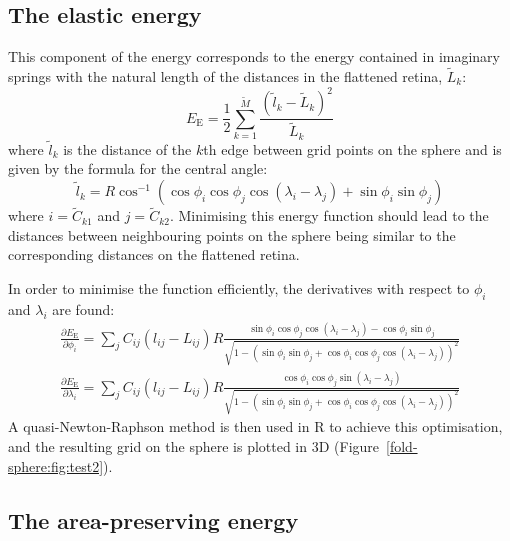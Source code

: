 \documentclass{article}
\newcommand{\EE}{\ensuremath{E_\mathrm{E}}\xspace}
\begin{document}
\subsection{The elastic energy}
\label{fold-sphere:sec:elastic-force}

This component of the energy corresponds to the energy contained in
imaginary springs with the natural length of the distances in the
flattened retina, $\tilde L_k$:
\begin{equation}
  \label{fold-sphere:eq:5}
  \EE  = \frac{1}{2} \sum_{k=1}^{\tilde M} \frac{(\tilde l_k- \tilde
    L_k)^2}{\tilde L_k}
\end{equation}
where $\tilde l_k$ is the distance of the $k$th edge between grid points on
the sphere and is given by the formula for the central angle:
\begin{equation}
  \label{fold-sphere:eq:2}
  \tilde l_k = R\cos^{-1}(\cos\phi_i\cos\phi_j\cos(\lambda_i-\lambda_j) + \sin\phi_i\sin\phi_j)
\end{equation}
where $i=\tilde C_{k1}$ and $j=\tilde C_{k2}$.  Minimising this energy function
should lead to the distances between neighbouring points on the sphere
being similar to the corresponding distances on the flattened retina.

In order to minimise the function efficiently, the derivatives with
respect to $\phi_i$ and $\lambda_i$ are found:
\begin{equation}
  \label{fold-sphere:eq:3}
  \begin{split}
    \frac{\partial \EE}{\partial\phi_i} = 
    \sum_j C_{ij} (l_{ij} - L_{ij})R
    \frac{\sin\phi_i\cos\phi_j\cos(\lambda_i-\lambda_j) - \cos\phi_i\sin\phi_j}
    {\sqrt{1-(\sin\phi_i\sin\phi_j +
        \cos\phi_i\cos\phi_j\cos(\lambda_i-\lambda_j))^2}} \\
    \frac{\partial \EE}{\partial\lambda_i} = 
    \sum_j C_{ij} (l_{ij} - L_{ij})R
    \frac{\cos\phi_i\cos\phi_j\sin(\lambda_i-\lambda_j)}
    {\sqrt{1-(\sin\phi_i\sin\phi_j + \cos\phi_i\cos\phi_j\cos(\lambda_i-\lambda_j))^2}}
  \end{split}
\end{equation}
A quasi-Newton-Raphson method is then used in R to achieve this
optimisation, and the resulting grid on the sphere is plotted in 3D
(Figure~\ref{fold-sphere:fig:test2}).

\subsection{The area-preserving energy}
\label{fold-sphere:sec:area-pres-energy}




\end{document}
